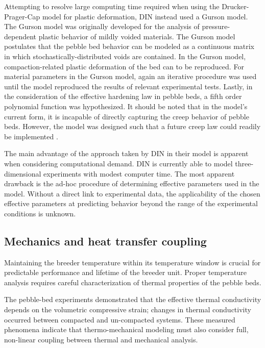 Attempting to resolve large computing time required when using the Drucker-Prager-Cap model for plastic deformation, DIN instead used a Gurson model. The Gurson model was originally developed for the analysis of pressure-dependent plastic behavior of mildly voided materials. The Gurson model postulates that the pebble bed behavior can be modeled as a continuous matrix in which stochastically-distributed voids are contained. In the Gurson model, compaction-related plastic deformation of the bed can to be reproduced. For material parameters in the Gurson model, again an iterative procedure was used until the model reproduced the results of relevant experimental tests. Lastly, in the consideration of the effective hardening law in pebble beds, a fifth order polynomial function was hypothesized. It should be noted that in the model's current form, it is incapable of directly capturing the creep behavior of pebble beds. However, the model was designed such that a future creep law could readily be implemented \cite{DellOrco:2007hc,DellOrco:2010zr,DiMaio20101234}.

The main advantage of the approach taken by DIN in their model is apparent when considering computational demand. DIN is currently able to model three-dimensional experiments with modest computer time. The most apparent drawback is the ad-hoc procedure of determining effective parameters used in the model. Without a direct link to experimental data, the applicability of the chosen effective parameters at predicting behavior beyond the range of the experimental conditions is unknown.

\subsection{Mechanics and heat transfer coupling}
Maintaining the breeder temperature within its temperature window is crucial for predictable performance and lifetime of the breeder unit. Proper temperature analysis requires careful characterization of thermal properties of the pebble beds. 

The pebble-bed experiments demonstrated that the effective thermal conductivity depends on the volumetric compressive strain; changes in thermal conductivity occurred between compacted and un-compacted systems. These measured phenomena indicate that thermo-mechanical modeling must also consider full, non-linear coupling between thermal and mechanical analysis.

